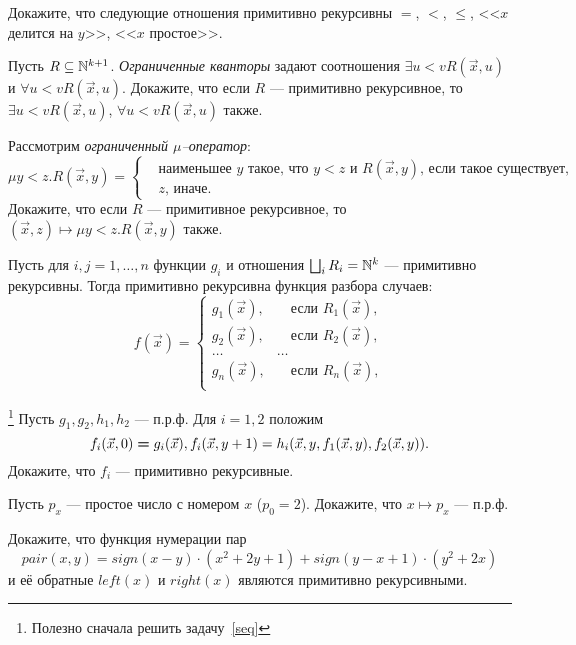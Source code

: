 \documentclass[a4paper, 12pt, num=Г1]{listok}
\begin{document}
\begin{problem}
	Докажите, что следующие отношения примитивно рекурсивны $=$, $<$, $\le$, <<$x$ делится на $y$>>, <<$x$ простое>>.
\end{problem}
\begin{problem}
	Пусть $R \subseteq \mathbb{N}^{k + 1}$.
	\textit{Ограниченные кванторы} задают соотношения $\exists{u<v} R(\vec x, u)$ и $\forall{u<v} R(\vec x, u)$.
	Докажите, что если $R$ --- примитивно рекурсивное, то $\exists{u < v} R(\vec x, u)$, $\forall{u < v} R(\vec x, u)$ также.
\end{problem}
\begin{problem}
	Рассмотрим \textit{ограниченный $\mu$--оператор}:
	\[
		\mu y < z.R(\vec x, y) = \left \{ \begin{aligned}
				&\text{наименьшее $y$ такое, что $y < z$ и $R(\vec x, y)$, если такое существует,} \\
				&\text{$z$, иначе.}
			\end{aligned} \right .
	\]
	Докажите, что если $R$ --- примитивное рекурсивное, то $(\vec x, z) \mapsto \mu y < z.R(\vec x, y)$ также.
\end{problem}
\begin{problem}
	Пусть для $i, j = 1, \dots, n$ функции $g_i$ и отношения $\bigsqcup_i R_i = \mathbb{N}^k$ --- примитивно рекурсивны.
	Тогда примитивно рекурсивна функция разбора случаев:
	\[
		f(\vec x) = \left \{ \begin{aligned}
			g_1(\vec x), &\quad\text{если $R_1(\vec x)$}, \\
			g_2(\vec x), &\quad\text{если $R_2(\vec x)$}, \\
			\dots & \dots \\
			g_n(\vec x), &\quad\text{если $R_n(\vec x)$}, \\
		\end{aligned} \right .
	\]
\end{problem}
\begin{problem}\footnote{Полезно сначала решить задачу~\ref{seq}}
	Пусть $g_1, g_2, h_1, h_2$ --- п.р.ф.
	Для $i = 1, 2$ положим
	\[
		f_i (\vec x, 0) \hm = g_i(\vec x), f_i(\vec x, y + 1) = h_i(\vec x, y, f_1(\vec x, y), f_2(\vec x, y)).
	\]
	Докажите, что $f_i$ --- примитивно рекурсивные.
\end{problem}
\begin{problem}
	Пусть $p_x$ --- простое число с номером $x$ ($p_0 = 2$).
	Докажите, что $x \mapsto p_x$ --- п.р.ф.
\end{problem}
\begin{problem}
	Докажите, что функция нумерации пар
	\[
		pair(x, y) = sign(x - y)\cdot (x^2 + 2y + 1)  + sign(y - x + 1) \cdot (y^2 + 2x)
	\]
	и её обратные $left(x)$ и $right(x)$ являются примитивно рекурсивными.
\end{problem}
\end{document}

